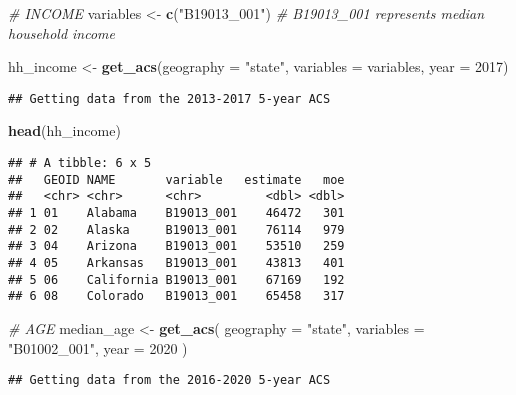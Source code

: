 \documentclass[
]{article}
\newenvironment{Shaded}{\begin{snugshade}}{\end{snugshade}}
\newcommand{\AttributeTok}[1]{\textcolor[rgb]{0.13,0.29,0.53}{#1}}
\newcommand{\CommentTok}[1]{\textcolor[rgb]{0.56,0.35,0.01}{\textit{#1}}}
\newcommand{\DecValTok}[1]{\textcolor[rgb]{0.00,0.00,0.81}{#1}}
\newcommand{\FunctionTok}[1]{\textcolor[rgb]{0.13,0.29,0.53}{\textbf{#1}}}
\newcommand{\NormalTok}[1]{#1}
\newcommand{\OtherTok}[1]{\textcolor[rgb]{0.56,0.35,0.01}{#1}}
\newcommand{\StringTok}[1]{\textcolor[rgb]{0.31,0.60,0.02}{#1}}
\begin{document}
\begin{Shaded}
\begin{Highlighting}[]
\CommentTok{\# INCOME}
\NormalTok{variables }\OtherTok{\textless{}{-}} \FunctionTok{c}\NormalTok{(}\StringTok{"B19013\_001"}\NormalTok{)  }\CommentTok{\# B19013\_001 represents median household income}

\NormalTok{hh\_income }\OtherTok{\textless{}{-}} \FunctionTok{get\_acs}\NormalTok{(}\AttributeTok{geography =} \StringTok{"state"}\NormalTok{, }\AttributeTok{variables =}\NormalTok{ variables, }\AttributeTok{year =} \DecValTok{2017}\NormalTok{)}
\end{Highlighting}
\end{Shaded}

\begin{verbatim}
## Getting data from the 2013-2017 5-year ACS
\end{verbatim}

\begin{Shaded}
\begin{Highlighting}[]
\FunctionTok{head}\NormalTok{(hh\_income)}
\end{Highlighting}
\end{Shaded}

\begin{verbatim}
## # A tibble: 6 x 5
##   GEOID NAME       variable   estimate   moe
##   <chr> <chr>      <chr>         <dbl> <dbl>
## 1 01    Alabama    B19013_001    46472   301
## 2 02    Alaska     B19013_001    76114   979
## 3 04    Arizona    B19013_001    53510   259
## 4 05    Arkansas   B19013_001    43813   401
## 5 06    California B19013_001    67169   192
## 6 08    Colorado   B19013_001    65458   317
\end{verbatim}

\begin{Shaded}
\begin{Highlighting}[]
\CommentTok{\# AGE}
\NormalTok{median\_age }\OtherTok{\textless{}{-}} \FunctionTok{get\_acs}\NormalTok{(}
  \AttributeTok{geography =} \StringTok{"state"}\NormalTok{,}
  \AttributeTok{variables =} \StringTok{"B01002\_001"}\NormalTok{,}
  \AttributeTok{year =} \DecValTok{2020}
\NormalTok{)}
\end{Highlighting}
\end{Shaded}

\begin{verbatim}
## Getting data from the 2016-2020 5-year ACS
\end{verbatim}
\end{document}
